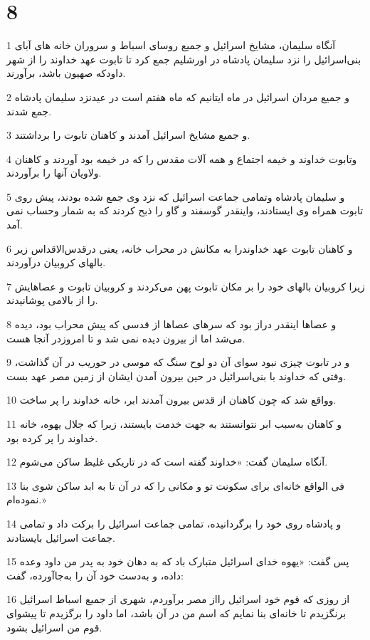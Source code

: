 \chapter{8}

\par 1 آنگاه سلیمان، مشایخ اسرائیل و جمیع روسای اسباط و سروران خانه های آبای بنی‌اسرائیل را نزد سلیمان پادشاه در اورشلیم جمع کرد تا تابوت عهد خداوند را از شهر داودکه صهیون باشد، برآورند.
\par 2 و جمیع مردان اسرائیل در ماه ایتانیم که ماه هفتم است در عیدنزد سلیمان پادشاه جمع شدند.
\par 3 و جمیع مشایخ اسرائیل آمدند و کاهنان تابوت را برداشتند.
\par 4 وتابوت خداوند و خیمه اجتماع و همه آلات مقدس را که در خیمه بود آوردند و کاهنان ولاویان آنها را برآوردند.
\par 5 و سلیمان پادشاه وتمامی جماعت اسرائیل که نزد وی جمع شده بودند، پیش روی تابوت همراه وی ایستادند، واینقدر گوسفند و گاو را ذبح کردند که به شمار وحساب نمی آمد.
\par 6 و کاهنان تابوت عهد خداوندرا به مکانش در محراب خانه، یعنی درقدس‌الاقداس زیر بالهای کروبیان درآوردند.
\par 7 زیرا کروبیان بالهای خود را بر مکان تابوت پهن می‌کردند و کروبیان تابوت و عصاهایش را از بالامی پوشانیدند.
\par 8 و عصاها اینقدر دراز بود که سرهای عصاها از قدسی که پیش محراب بود، دیده می‌شد اما از بیرون دیده نمی شد و تا امروزدر آنجا هست.
\par 9 و در تابوت چیزی نبود سوای آن دو لوح سنگ که موسی در حوریب در آن گذاشت، وقتی که خداوند با بنی‌اسرائیل در حین بیرون آمدن ایشان از زمین مصر عهد بست.
\par 10 وواقع شد که چون کاهنان از قدس بیرون آمدند ابر، خانه خداوند را پر ساخت.
\par 11 و کاهنان به‌سبب ابر نتوانستند به جهت خدمت بایستند، زیرا که جلال یهوه، خانه خداوند را پر کرده بود.
\par 12 آنگاه سلیمان گفت: «خداوند گفته است که در تاریکی غلیظ ساکن می‌شوم.
\par 13 فی الواقع خانه‌ای برای سکونت تو و مکانی را که در آن تا به ابد ساکن شوی بنا نموده‌ام.»
\par 14 و پادشاه روی خود را برگردانیده، تمامی جماعت اسرائیل را برکت داد و تمامی جماعت اسرائیل بایستادند.
\par 15 پس گفت: «یهوه خدای اسرائیل متبارک باد که به دهان خود به پدر من داود وعده داده، و به‌دست خود آن را به‌جاآورده، گفت:
\par 16 از روزی که قوم خود اسرائیل رااز مصر برآوردم، شهری از جمیع اسباط اسرائیل برنگزیدم تا خانه‌ای بنا نمایم که اسم من در آن باشد، اما داود را برگزیدم تا پیشوای قوم من اسرائیل بشود.
